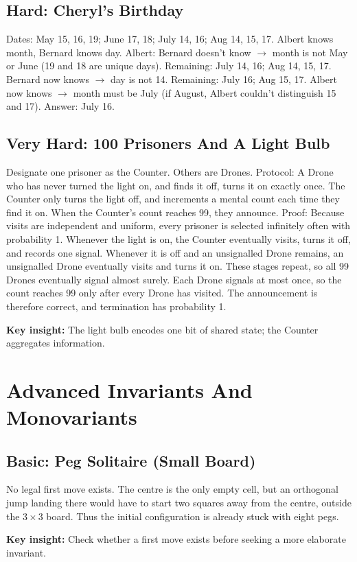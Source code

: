 \documentclass[12pt]{article}
\newcommand{\insight}[1]{\par\medskip\noindent\textbf{Key insight:} #1}
\begin{document}
\subsection*{Hard: Cheryl's Birthday}
Dates: May 15, 16, 19; June 17, 18; July 14, 16; Aug 14, 15, 17.
Albert knows month, Bernard knows day.
Albert: Bernard doesn't know $\to$ month is not May or June (19 and
18 are unique days). Remaining: July 14, 16; Aug 14, 15, 17.
Bernard now knows $\to$ day is not 14. Remaining: July 16; Aug 15, 17.
Albert now knows $\to$ month must be July (if August, Albert couldn't
distinguish 15 and 17). Answer: July 16.

\subsection*{Very Hard: 100 Prisoners And A Light Bulb}
Designate one prisoner as the Counter. Others are Drones.
Protocol: A Drone who has never turned the light on, and finds it
off, turns it on exactly once. The Counter only turns the light off,
and increments a mental count each time they find it on. When the
Counter's count reaches 99, they announce.
Proof: Because visits are independent and uniform, every prisoner is
selected infinitely often with probability 1. Whenever the light is
on, the Counter eventually visits, turns it off, and records one
signal. Whenever it is off and an unsignalled Drone remains, an
unsignalled Drone eventually visits and turns it on. These stages
repeat, so all 99 Drones eventually signal almost surely. Each Drone
signals at most once, so the count reaches 99 only after every Drone
has visited. The announcement is therefore correct, and termination
has probability 1.
\insight{The light bulb encodes one bit of shared state; the Counter
aggregates information.}

\section{Advanced Invariants And Monovariants}

\subsection*{Basic: Peg Solitaire (Small Board)}
No legal first move exists. The centre is the only empty cell, but
an orthogonal jump landing there would have to start two squares away
from the centre, outside the $3\times3$ board. Thus the initial
configuration is already stuck with eight pegs.
\insight{Check whether a first move exists before seeking a more elaborate invariant.}
\end{document}
